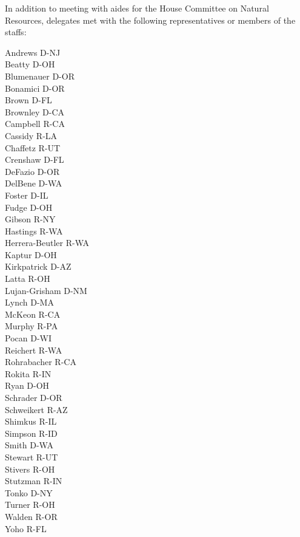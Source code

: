 

\noindent
In addition to meeting with aides for the House Committee on Natural Resources,
delegates met with the following representatives or members of the staffs:

\begin{multicols}{3}
\noindent
Andrews D-NJ \\
Beatty D-OH \\
Blumenauer D-OR \\
Bonamici D-OR \\
Brown D-FL \\
Brownley D-CA \\
Campbell R-CA \\
Cassidy R-LA \\
Chaffetz R-UT \\
Crenshaw D-FL \\
DeFazio D-OR \\
DelBene D-WA \\
Foster D-IL \\
Fudge D-OH \\
Gibson R-NY \\
Hastings R-WA \\
Herrera-Beutler R-WA \\
Kaptur D-OH \\
Kirkpatrick D-AZ \\
Latta R-OH \\
Lujan-Grisham D-NM \\
Lynch D-MA \\
McKeon R-CA \\
Murphy R-PA \\
Pocan D-WI \\
Reichert R-WA \\
Rohrabacher R-CA \\
Rokita R-IN \\
Ryan D-OH \\
Schrader D-OR \\
Schweikert R-AZ \\
Shimkus R-IL \\
Simpson R-ID \\
Smith D-WA \\
Stewart R-UT \\
Stivers R-OH \\
Stutzman R-IN \\
Tonko D-NY \\
Turner R-OH \\
Walden R-OR \\
Yoho R-FL \\
\end{multicols}
